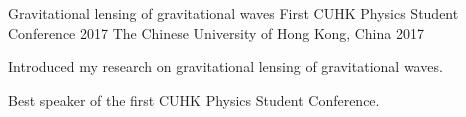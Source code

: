 \begin{cventries}
  \cventry
    {Gravitational lensing of gravitational waves} %
    {First CUHK Physics Student Conference 2017} %
    {The Chinese University of Hong Kong, China} %
    {2017} %
    {
      \begin{cvitems} %
        \item {Introduced my research on gravitational lensing of gravitational waves.}
        \item {Best speaker of the first CUHK Physics Student Conference.}
      \end{cvitems}
    }

\end{cventries}
